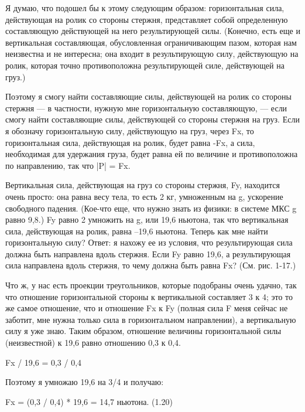 \documentclass[10pt,oneside]{article}
\begin{document}
Я думаю, что подошел бы к этому следующим образом: горизонтальная сила, действующая на ролик со стороны стержня, представляет собой определенную составляющую действующей на него результирующей силы. (Конечно, есть еще и вертикальная составляющая, обусловленная ограничивающим пазом, которая нам неизвестна и не интересна; она входит в результирующую силу, действующую на ролик, которая точно противоположна результирующей силе, действующей на груз.)\par

Поэтому я смогу найти составляющие силы, действующей на ролик со стороны стержня --- в частности, нужную мне горизонтальную составляющую, --- если смогу найти составляющие силы, действующей со стороны стержня на груз. Если я обозначу горизонтальную силу, действующую на груз, через Fx, то горизонтальная сила, действующая на ролик, будет равна -Fx, а сила, необходимая для удержания груза, будет равна ей по величине и противоположна по направлению, так что |P| = Fx.\par

Вертикальная сила, действующая на груз со стороны стержня, Fy, находится очень просто: она равна весу тела, то есть 2 кг, умноженным на g, ускорение свободного падения. (Кое-что еще, что нужно знать из физики: в системе МКС g равно 9,8.) Fy равно 2 умножить на g, или 19,6 ньютона, так что вертикальная сила, действующая на ролик, равна –19,6 ньютона. Теперь как мне найти горизонтальную силу? Ответ: я нахожу ее из условия, что результирующая сила должна быть направлена вдоль стержня. Если Fy равно 19,6, а результирующая сила направлена вдоль стержня, то чему должна быть равна Fx? (См. рис. 1-17.)\par

Что ж, у нас есть проекции треугольников, которые подобраны очень удачно, так что отношение горизонтальной стороны к вертикальной составляет 3 к 4; это то же самое отношение, что и отношение Fx к Fy (полная сила F меня сейчас не заботит, мне нужна только сила в горизонтальном направлении), а вертикальную силу я уже знаю. Таким образом, отношение величины горизонтальной силы (неизвестной) к 19,6 равно отношению 0,3 к 0,4.\par

Fx / 19,6 = 0,3 / 0,4\par

Поэтому я умножаю 19,6 на 3/4 и получаю:\par

Fx = (0,3 / 0,4) * 19,6 = 14,7 ньютона. (1.20)\par
\end{document}

